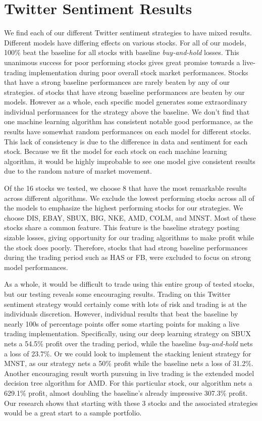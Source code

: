 \documentclass[../thesis.tex]{subfiles}
\begin{document}
\chapter{Twitter Sentiment Results}
\label{ch:sentimentresults}

We find each of our different Twitter sentiment strategies to have mixed results. Different models have differing effects on various stocks. For all of our models, 100\% beat the baseline for all stocks with baseline \textit{buy-and-hold} losses. This unanimous success for poor performing stocks gives great promise towards a live-trading implementation during poor overall stock market performances. Stocks that have a strong baseline performances are rarely beaten by any of our strategies.  of stocks that have strong baseline performances are beaten by our models. However as a whole, each specific model generates some extraordinary individual performances for the strategy above the baseline. We don't find that one machine learning algorithm has consistent notable good performance, as the results have somewhat random performances on each model for different stocks. This lack of consistency is due to the difference in data and sentiment for each stock. Because we fit the model for each stock on each machine learning algorithm, it would be highly improbable to see one model give consistent results due to the random nature of market movement. 

Of the 16 stocks we tested, we choose 8 that have the most remarkable results across different algorithms. We exclude the lowest performing stocks across all of the models to emphasize the highest performing stocks for our strategies. We choose DIS, EBAY, SBUX, BIG, NKE, AMD, COLM, and MNST. Most of these stocks share a common feature. This feature is the baseline strategy posting sizable losses, giving opportunity for our trading algorithms to make profit while the stock does poorly. Therefore, stocks that had strong baseline performances during the trading period such as HAS or FB, were excluded to focus on strong model performances. 

As a whole, it would be difficult to trade using this entire group of tested stocks, but our testing reveals some encouraging results. Trading on this Twitter sentiment strategy would certainly come with lots of risk and trading is at the individuals discretion. However, individual results that beat the baseline by nearly 100s of percentage points offer some starting points for making a live trading implementation. Specifically, using our deep learning strategy on SBUX nets a 54.5\% profit over the trading period, while the baseline \textit{buy-and-hold} nets a loss of 23.7\%. Or we could look to implement the stacking lenient strategy for MNST, as our strategy nets a 50\% profit while the baseline nets a loss of 31.2\%. Another encouraging result worth pursuing in live trading is the extended model decision tree algorithm for AMD. For this particular stock, our algorithm nets a 629.1\% profit, almost doubling the baseline's already impressive 307.3\% profit. Our research shows that starting with these 3 stocks and the associated strategies would be a great start to a sample portfolio.
\end{document}
